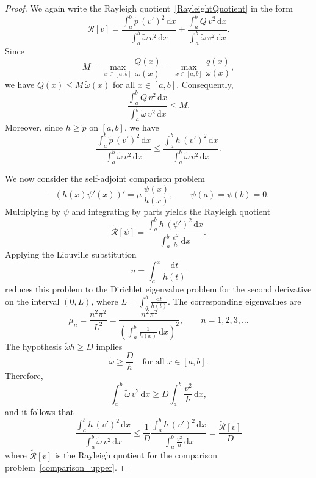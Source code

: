 \documentclass[11pt, reqno]{amsart}
\numberwithin{equation}{section}  %
\theoremstyle{plain}
\theoremstyle{definition}
\theoremstyle{remark}
\begin{document}
\begin{proof}
We again write the Rayleigh quotient~\eqref{RayleightQuotient} in the form
\[
\mathcal{R}[v]
= \frac{\displaystyle\int_a^b \tilde{p}\,(v')^2\,\mathrm{d}x}
       {\displaystyle\int_a^b \tilde{\omega}\,v^2\,\mathrm{d}x}
+ \frac{\displaystyle\int_a^b Q\,v^2\,\mathrm{d}x}
       {\displaystyle\int_a^b \tilde{\omega}\,v^2\,\mathrm{d}x}.
\]
Since
\[
M=\max_{x\in[a,b]}\frac{Q(x)}{\tilde{\omega}(x)}
   =\max_{x\in[a,b]}\frac{q(x)}{\omega(x)},
\]
we have $Q(x)\le M\,\tilde{\omega}(x)$ for all $x\in[a,b]$. Consequently,
\[
\frac{\displaystyle\int_a^b Q\,v^2\,\mathrm{d}x}
     {\displaystyle\int_a^b \tilde{\omega}\,v^2\,\mathrm{d}x}
\le M.
\]
Moreover, since $h\ge\tilde{p}$ on $[a,b]$, we have
\[
\frac{\displaystyle\int_a^b \tilde{p}\,(v')^2\,\mathrm{d}x}
     {\displaystyle\int_a^b \tilde{\omega}\,v^2\,\mathrm{d}x}
\le
\frac{\displaystyle\int_a^b h\,(v')^2\,\mathrm{d}x}
     {\displaystyle\int_a^b \tilde{\omega}\,v^2\,\mathrm{d}x}.
\]

We now consider the self-adjoint comparison problem
\begin{equation}\label{comparison_upper}
-(h(x)\psi'(x))' = \mu\,\frac{\psi(x)}{h(x)},
\qquad
\psi(a)=\psi(b)=0.
\end{equation}
Multiplying by $\psi$ and integrating by parts yields the Rayleigh quotient
\[
\tilde{\mathcal{R}}[\psi]
=
\frac{\displaystyle\int_a^b h\,(\psi')^2\,\mathrm{d}x}
     {\displaystyle\int_a^b \frac{\psi^2}{h}\,\mathrm{d}x}.
\]
Applying the Liouville substitution
\[
u=\int_a^x \frac{\mathrm{d}t}{h(t)}
\]
reduces this problem to the Dirichlet eigenvalue problem for the second derivative on the interval
\(
(0,L)
\),
where
\(
L=\int_a^b \frac{\mathrm{d}t}{h(t)}.
\)
The corresponding eigenvalues are
\[
\mu_n
=
\frac{n^2\pi^2}{L^2}
=
\frac{n^2\pi^2}
{\left(\displaystyle\int_a^b \frac{1}{h(x)}\,\mathrm{d}x\right)^2},
\qquad n=1,2,3,\ldots
\]
The hypothesis $\tilde{\omega}h\ge D$ implies
\[
\tilde{\omega}\ge \frac{D}{h} \quad \text{for all } x\in[a,b].
\]
Therefore,
\[
\int_a^b \tilde{\omega}\,v^2\,\mathrm{d}x
\ge
D\int_a^b \frac{v^2}{h}\,\mathrm{d}x,
\]
and it follows that
\[
\frac{\displaystyle\int_a^b h\,(v')^2\,\mathrm{d}x}
     {\displaystyle\int_a^b \tilde{\omega}\,v^2\,\mathrm{d}x}
\le
\frac{1}{D}
\frac{\displaystyle\int_a^b h\,(v')^2\,\mathrm{d}x}
     {\displaystyle\int_a^b \frac{v^2}{h}\,\mathrm{d}x}=\dfrac{\tilde{\mathcal{R}}[v]}{D}
\]
where $\tilde{\mathcal{R}}[v]$ is the Rayleigh quotient for the comparison problem~\eqref{comparison_upper}. 


\end{proof}
\end{document}

